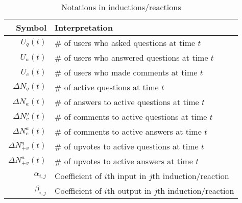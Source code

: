 \iffalse
\begin{figure}
  \centering
  \tikz{ %
    \node[latent] (alpha) {$\alpha$} ; %
    \node[latent, right=of alpha] (theta) {$\theta$} ; %
    \node[latent, right=of theta] (z) {z} ; %
    \node[latent, above=of z] (beta) {$\beta$} ; %
    \node[obs, right=of z] (w) {w} ; %
    \plate[inner sep=0.25cm, xshift=-0.12cm, yshift=0.12cm] {plate1} {(z) (w)} {N}; %
    \plate[inner sep=0.25cm, xshift=-0.12cm, yshift=0.12cm] {plate2} {(theta) (plate1)} {M}; %
    \edge {alpha} {theta} ; %
    \edge {theta} {z} ; %
    \edge {z,beta} {w} ; %
  }
\end{figure}
\fi

\begin{figure}
  \centering
\end{figure}

\begin{table}[hbt]
	\centering
	\begin{tabular}{rl}
	\toprule
	\textbf{Symbol} & \textbf{Interpretation}\\ \midrule
	$U_q(t)$ & \# of users who asked questions at time $t$\\
	$U_a(t)$ & \# of users who answered questions at time $t$\\
	$U_c(t)$ & \# of users who made comments at time $t$\\
	$\Delta N_q(t)$ & \# of active questions at time $t$\\
	$\Delta N_a(t)$ & \# of answers to active questions at time $t$\\
	$\Delta N_c^q(t)$ & \# of comments to active questions at time $t$\\
	$\Delta N_c^a(t)$ & \# of comments to active answers at time $t$\\
	$\Delta N_{+v}^q(t)$ & \# of upvotes to active questions at time $t$\\
	$\Delta N_{+v}^a(t)$ & \# of upvotes to active answers at time $t$\\
	$\alpha_{i, j}$ & Coefficient of $i$th input in $j$th induction/reaction\\
	$\beta_{i, j}$ & Coefficient of $i$th output in $j$th induction/reaction\\ \bottomrule
	 \end{tabular}
    \caption{Notations in inductions/reactions}
\end{table}

